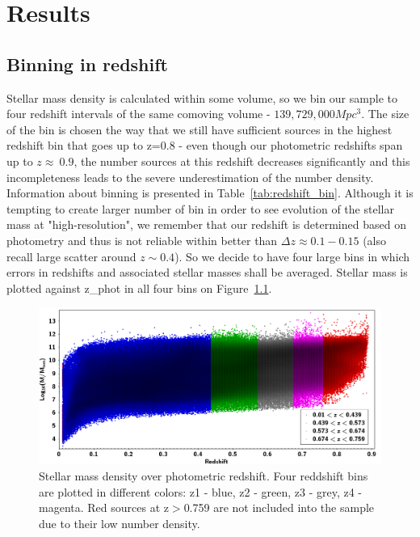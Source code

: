 \chapter{Results}\label{CH_04}

\section{Binning in redshift}
Stellar mass density is calculated within some volume, so we bin our sample to four redshift intervals of the same comoving volume - $139,729,000 Mpc^{3}$. The size of the bin is chosen the way that we still have sufficient sources in the highest redshift bin that goes up to z=0.8 - even though our photometric redshifts span up to $z\approx~0.9$, the number sources at this redshift decreases significantly and this incompleteness leads to the severe underestimation of the number density. Information about binning is presented in Table~\ref{tab:redshift_bin}. Although it is tempting to create larger number of bin in order to see evolution of the stellar mass at "high-resolution", we remember that our redshift is determined based on photometry and thus is not reliable within better than $\Delta z\approx 0.1-0.15$ (also recall large scatter around $z\sim0.4$). So we decide to have four large bins in which errors in redshifts and associated stellar masses shall be averaged. Stellar mass is plotted against z\_phot in all four bins on Figure~\ref{fig:sm_z_dissect}.

\begin{figure}[!ht]
\includegraphics[width=6in]{Figures/mass_vs_photo_z_dissected.png}
\caption{Stellar mass density over photometric redshift. Four reddshift bins are plotted in different colors: z1 - blue, z2 - green, z3 - grey, z4 - magenta. Red sources at z$>$0.759 are not included into the sample due to their low number density.}
\label{fig:sm_z_dissect}
\end{figure}

